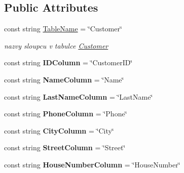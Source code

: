\subsection*{Public Attributes}
\begin{DoxyCompactItemize}
\item 
const string \mbox{\hyperlink{class_eshop_1_1_customer_aaca79a11328569acabc8e6441b103ef3}{Table\+Name}} = \char`\"{}Customer\char`\"{}
\begin{DoxyCompactList}\small\item\em nazvy sloupcu v tabulce \mbox{\hyperlink{class_eshop_1_1_customer}{Customer}} \end{DoxyCompactList}\item 
\mbox{\label{class_eshop_1_1_customer_abb04c779dfa3b713a7fafb3ddf807d7c}} 
const string {\bfseries I\+D\+Column} = \char`\"{}Customer\+ID\char`\"{}
\item 
\mbox{\label{class_eshop_1_1_customer_af517f2f1bc96aba4d2e4e867555987aa}} 
const string {\bfseries Name\+Column} = \char`\"{}Name\char`\"{}
\item 
\mbox{\label{class_eshop_1_1_customer_ab91f8edc3914e3990ae4dcb453f436b2}} 
const string {\bfseries Last\+Name\+Column} = \char`\"{}Last\+Name\char`\"{}
\item 
\mbox{\label{class_eshop_1_1_customer_a32fda7274c27318ed505f576108b2cb9}} 
const string {\bfseries Phone\+Column} = \char`\"{}Phone\char`\"{}
\item 
\mbox{\label{class_eshop_1_1_customer_a555a8c9409216b4855feedf680e7e839}} 
const string {\bfseries City\+Column} = \char`\"{}City\char`\"{}
\item 
\mbox{\label{class_eshop_1_1_customer_af6bdf0ba31f125faf1b4f5f037bddc4a}} 
const string {\bfseries Street\+Column} = \char`\"{}Street\char`\"{}
\item 
\mbox{\label{class_eshop_1_1_customer_ae9fe58147ecb7e0d93b41b53b7442cf8}} 
const string {\bfseries House\+Number\+Column} = \char`\"{}House\+Number\char`\"{}
\item 

\end{DoxyCompactItemize}
